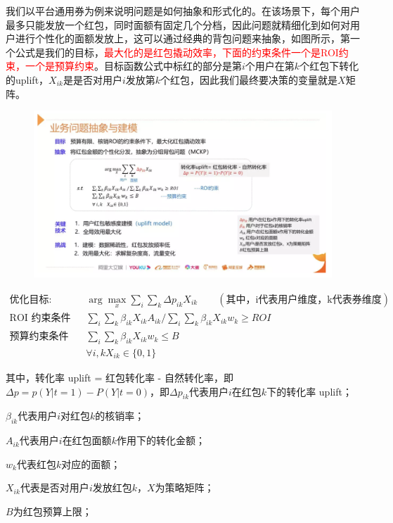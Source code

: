 \documentclass[12pt]{article}
\begin{document}
我们以平台通用券为例来说明问题是如何抽象和形式化的。在该场景下，每个用户最多只能发放一个红包，同时面额有固定几个分档，因此问题就精细化到如何对用户进行个性化的面额发放上，这可以通过经典的背包问题来抽象，如图所示，第一个公式是我们的目标，\textcolor{red}{最大化的是红包撬动效率，下面的约束条件一个是ROI约束，一个是预算约束}。目标函数公式中标红的部分是第$i$个用户在第$k$个红包下转化的uplift，$X_{ik}$是是否对用户$i$发放第$k$个红包，因此我们最终要决策的变量就是$X$矩阵。
\begin{figure}[H]
    \centering
    \includegraphics[width=1\textwidth]{fig/CasualInference-Uplift-Model-In-Ali2.png}
\end{figure}

\begin{align*}
\text{优化目标}: \qquad & \arg\max_x \sum_i\sum_k \Delta p_{ik}X_{ik}  \qquad(\text{其中，i代表用户维度，k代表券维度}) \\
\text{ROI 约束条件} \qquad & \sum_i\sum_k\beta_{ik}X_{ik}A_{ik} / \sum_i\sum_k\beta_{ik}X_{ik}w_k \ge ROI \\
\text{预算约束条件} \qquad & \sum_i\sum_k\beta_{ik}X_{ik}w_{k} \le B \\
& \forall i, k X_{ik} \in \{0, 1\}
\end{align*}

其中，转化率 uplift = 红包转化率 - 自然转化率，即$\Delta p = p(Y|t = 1) - P(Y|t = 0) $，即$\Delta p_{ik}$代表用户$i$在红包$k$下的转化率 uplift；

$\beta_{ik}$代表用户$i$对红包$k$的核销率；

$A_{ik}$代表用户$i$在红包面额$k$作用下的转化金额；

$w_{k}$代表红包$k$对应的面额；

$X_{ik}$代表是否对用户$i$发放红包$k$，$X$为策略矩阵；

$B$为红包预算上限；
\end{document}
